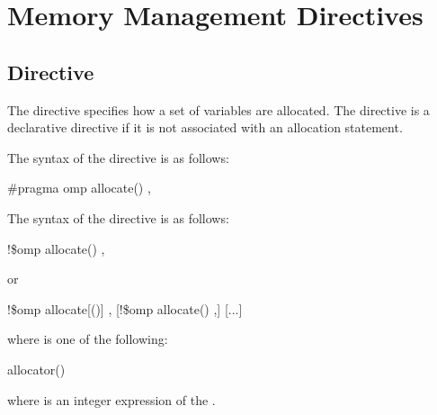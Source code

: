 \section{Memory Management Directives}
\label{sec:Memory Management Directives}


\subsection{ Directive}
\label{subsec:allocate Directive}
\summary

The  directive specifies how a set of variables are allocated. The  directive is a declarative directive if it is not associated with an allocation statement.

\syntax
\begin{ccppspecific}
The syntax of the  directive is as follows:

\begin{boxedcode}
\#pragma omp allocate() \plc{[clause[ [ [},\plc{] clause] ... ]] new-line}
\end{boxedcode}

\end{ccppspecific}
\medskip

\begin{fortranspecific}
The syntax of the  directive is as follows:

\begin{boxedcode}
!\$omp allocate() \plc{[clause[ [ [},\plc{] clause] ... ]]}
\end{boxedcode}

or
\begin{boxedcode}
!\$omp allocate[()] \plc{clause[ [ [},\plc{] clause] ... ]}
[!\$omp allocate() \plc{clause[ [ [},\plc{] clause] ... ]}]
[...]
\end{boxedcode}

where  is one of the following:

\begin{indentedcodelist}
allocator()
\end{indentedcodelist}

where  is an integer expression of the  .

\end{fortranspecific}

